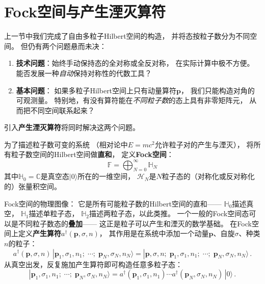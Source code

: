 \section{Fock空间与产生湮灭算符}\label{sec:fock}
上一节中我们完成了自由多粒子Hilbert空间的构造，
并将态按粒子数分为不同空间。
但仍有两个问题悬而未决：

\begin{enumerate}
\item \textbf{技术问题}：始终手动保持态的全对称或全反对称，
      在实际计算中极不方便。
      能否发展一种\emph{自动}保持对称性的代数工具？
\item \textbf{基本问题}：
      如果多粒子Hilbert空间上只有动量算符$\boldsymbol{p}$，
      我们只能构造对角的可观测量。
      特别地，有没有算符能在\emph{不同粒子数}的态上具有非零矩阵元，
      从而把不同空间联系起来？
\end{enumerate}

\noindent 引入\textbf{产生湮灭算符}将同时解决这两个问题。


为了描述粒子数可变的系统
（相对论中$E=mc^2$允许粒子对的产生与湮灭），
将所有粒子数空间的Hilbert空间做\textbf{直和}，
定义\textbf{Fock空间}：
\begin{equation}\label{eq:fockspace}
\boxed{\mathbb{F} = \bigoplus_{N=0}^{\infty}\mathbb{H}_N}
\end{equation}
其中$\mathbb{H}_0=\mathbb{C}$是真空态$|0\rangle$所在的一维空间，
$\mathscr{H}_N$是$N$粒子态的（对称化或反对称化的）张量积空间。

Fock空间的物理图像：
它是所有可能粒子数的Hilbert空间的直和——
$\mathbb{H}_0$描述真空，
$\mathbb{H}_1$描述单粒子态，
$\mathbb{H}_2$描述两粒子态，以此类推。
一个一般的Fock空间态可以是不同粒子数态的\textbf{叠加}——
这正是粒子可以产生和湮灭的数学基础。
在Fock空间上定义\textbf{产生算符}$a^\dagger(\boldsymbol{p},\sigma,n)$，
其作用是在系统中添加一个动量$\boldsymbol{p}$、自旋$\sigma$、种类$n$的粒子：
\begin{equation}\label{eq:creationdef}
a^\dagger(\boldsymbol{p},\sigma,n)\,
|\boldsymbol{p}_1,\sigma_1,n_1;\;\cdots;\;\boldsymbol{p}_N,\sigma_N,n_N\rangle
= |\boldsymbol{p},\sigma,n;\;\boldsymbol{p}_1,\sigma_1,n_1;\;\cdots;\;
\boldsymbol{p}_N,\sigma_N,n_N\rangle\,.
\end{equation}
从真空出发，反复施加产生算符即可构造任意多粒子态：
\begin{equation}\label{eq:fockbuild}
|\boldsymbol{p}_1,\sigma_1,n_1;\;\cdots;\;\boldsymbol{p}_N,\sigma_N,n_N\rangle
= a^\dagger(\boldsymbol{p}_1,\sigma_1,n_1)\cdots
  a^\dagger(\boldsymbol{p}_N,\sigma_N,n_N)\,|0\rangle\,.
\end{equation}

